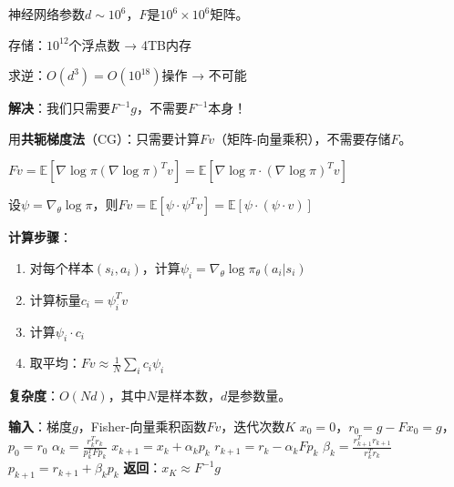 \documentclass[11pt,a4paper]{article}
\theoremstyle{definition}
\begin{document}
\begin{plainwords}[为什么不直接求$F^{-1}$]
神经网络参数$d \sim 10^6$，$F$是$10^6 \times 10^6$矩阵。

存储：$10^{12}$个浮点数 → 4TB内存

求逆：$O(d^3) = O(10^{18})$操作 → 不可能

\textbf{解决}：我们只需要$F^{-1}g$，不需要$F^{-1}$本身！

用\textbf{共轭梯度法}（CG）：只需要计算$Fv$（矩阵-向量乘积），不需要存储$F$。
\end{plainwords}

\begin{keypoint}
$Fv = \mathbb{E}[\nabla \log \pi (\nabla \log \pi)^T v] = \mathbb{E}[\nabla \log \pi \cdot (\nabla \log \pi)^T v]$

设$\psi = \nabla_\theta \log \pi$，则$Fv = \mathbb{E}[\psi \cdot \psi^T v] = \mathbb{E}[\psi \cdot (\psi \cdot v)]$

\textbf{计算步骤}：
\begin{enumerate}
    \item 对每个样本$(s_i, a_i)$，计算$\psi_i = \nabla_\theta \log \pi_\theta(a_i|s_i)$
    \item 计算标量$c_i = \psi_i^T v$
    \item 计算$\psi_i \cdot c_i$
    \item 取平均：$Fv \approx \frac{1}{N}\sum_i c_i \psi_i$
\end{enumerate}

\textbf{复杂度}：$O(Nd)$，其中$N$是样本数，$d$是参数量。
\end{keypoint}

\begin{algorithm}[H]
\caption{共轭梯度法求$F^{-1}g$}
\begin{algorithmic}[1]
\State \textbf{输入}：梯度$g$，Fisher-向量乘积函数$Fv$，迭代次数$K$
\State $x_0 = 0$，$r_0 = g - Fx_0 = g$，$p_0 = r_0$
    \State $\alpha_k = \frac{r_k^T r_k}{p_k^T F p_k}$ 
    \State $x_{k+1} = x_k + \alpha_k p_k$ 
    \State $r_{k+1} = r_k - \alpha_k F p_k$ 
    \State $\beta_k = \frac{r_{k+1}^T r_{k+1}}{r_k^T r_k}$ 
    \State $p_{k+1} = r_{k+1} + \beta_k p_k$ 
\EndFor
\State \textbf{返回}：$x_K \approx F^{-1}g$
\end{algorithmic}
\end{algorithm}
\end{document}
